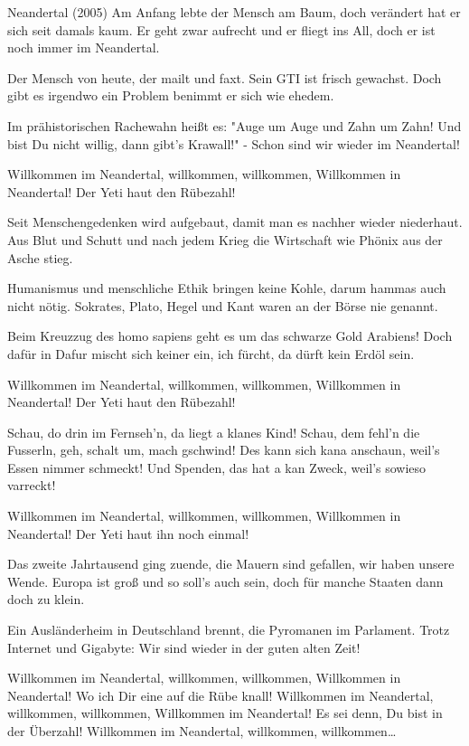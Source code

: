 \begin{guitar}
	Neandertal (2005)
	\footnotesize 
	Am Anfang lebte der Mensch am Baum, doch verändert hat er sich seit damals kaum.
	Er geht zwar aufrecht und er fliegt ins All, doch er ist noch immer im Neandertal.
	
	Der Mensch von heute, der mailt und faxt. Sein GTI ist frisch gewachst.
	Doch gibt es irgendwo ein Problem benimmt er sich wie ehedem.
	
	Im prähistorischen Rachewahn heißt es: "Auge um Auge und Zahn um Zahn!
	Und bist Du nicht willig, dann gibt’s Krawall!" - Schon sind wir wieder im Neandertal!
	
	Willkommen im Neandertal, willkommen, willkommen,
	Willkommen in Neandertal! Der Yeti haut den Rübezahl!
	
	Seit Menschengedenken wird aufgebaut, damit man es nachher wieder niederhaut.
	Aus Blut und Schutt und nach jedem Krieg die Wirtschaft wie Phönix aus der Asche stieg.
	
	Humanismus und menschliche Ethik bringen keine Kohle, darum hammas auch nicht nötig.
	Sokrates, Plato, Hegel und Kant waren an der Börse nie genannt.
	
	Beim Kreuzzug des homo sapiens geht es um das schwarze Gold Arabiens!
	Doch dafür in Dafur mischt sich keiner ein, ich fürcht, da dürft kein Erdöl sein.
	
	Willkommen im Neandertal, willkommen, willkommen,
	Willkommen in Neandertal! Der Yeti haut den Rübezahl!
	
	Schau, do drin im Fernseh’n, da liegt a klanes Kind!
	Schau, dem fehl’n die Fusserln, geh, schalt um, mach gschwind!
	Des kann sich kana anschaun, weil’s Essen nimmer schmeckt!
	Und Spenden, das hat a kan Zweck, weil’s sowieso varreckt!
	
	Willkommen im Neandertal, willkommen, willkommen,
	Willkommen in Neandertal! Der Yeti haut ihn noch einmal!
	
	Das zweite Jahrtausend ging zuende, die Mauern sind gefallen, wir haben unsere Wende.
	Europa ist groß und so soll’s auch sein, doch für manche Staaten dann doch zu klein.
	
	Ein Ausländerheim in Deutschland brennt, die Pyromanen im Parlament.
	Trotz Internet und Gigabyte: Wir sind wieder in der guten alten Zeit!
	
	Willkommen im Neandertal, willkommen, willkommen,
	Willkommen in Neandertal! Wo ich Dir eine auf die Rübe knall!
	Willkommen im Neandertal, willkommen, willkommen,
	Willkommen im Neandertal! Es sei denn, Du bist in der Überzahl!
	Willkommen im Neandertal, willkommen, willkommen…
\end{guitar}